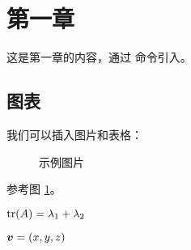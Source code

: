 \section{第一章}

这是第一章的内容，通过 \verb|| 命令引入。

\subsection{图表}

我们可以插入图片和表格：

\begin{figure}[htbp]
    \centering
    \caption{示例图片}
    \label{fig:example}
\end{figure}

参考图 \ref{fig:example}。


$\operatorname{tr}(A) = \lambda_1 + \lambda_2$

$\boldsymbol{v} = (x, y, z)$ 